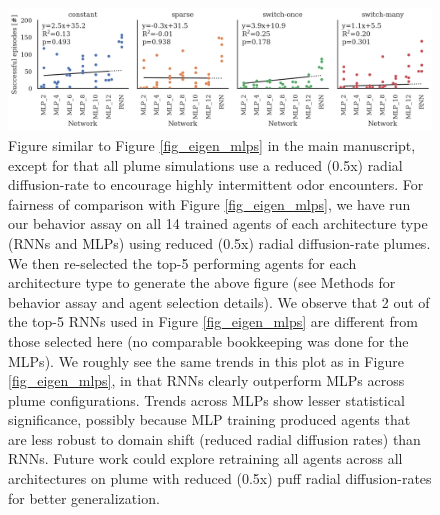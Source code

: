 \documentclass[5p,twocolumn,authoryear]{elsarticle}
\begin{document}
\begin{figure}[h!]
\centering
\includegraphics[width=0.99\linewidth]{home_by_arch_facet_d50.png}
\caption{
Figure similar to Figure \ref{fig_eigen_mlps} in the main manuscript, except for that all plume simulations use a reduced (0.5x) radial diffusion-rate to encourage highly intermittent odor encounters.
For fairness of comparison with Figure \ref{fig_eigen_mlps}, we have run our behavior assay on all 14 trained agents of each architecture type (RNNs and MLPs) using reduced (0.5x) radial diffusion-rate plumes. 
We then re-selected the top-5 performing agents for each architecture type to generate the above figure (see Methods for behavior assay and agent selection details). 
We observe that 2 out of the top-5 RNNs used in Figure \ref{fig_eigen_mlps} are different from those selected here (no comparable bookkeeping was done for the MLPs).
We roughly see the same trends in this plot as in Figure \ref{fig_eigen_mlps}, in that RNNs clearly outperform MLPs across plume configurations.
Trends across MLPs show lesser statistical significance, possibly because MLP training produced agents that are less robust to domain shift (reduced radial diffusion rates) than RNNs.
Future work could explore retraining all agents across all architectures on plume with reduced (0.5x) puff radial diffusion-rates for better generalization.
}
\label{sec_supp_reduceddiff_fig6}
\end{figure}
\end{document}
